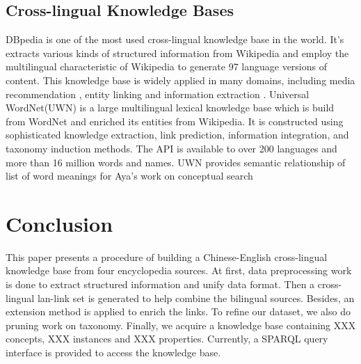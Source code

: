 \documentclass[runningheads,a4paper]{llncs}
\begin{document}
\subsection{Cross-lingual Knowledge Bases}
DBpedia \cite{auer2007dbpedia,mendes2012dbpedia} is one of the most used cross-lingual knowledge base in the world. It's extracts various kinds of structured information from Wikipedia and employ the multilingual characteristic of Wikipedia to generate 97 language versions of content. This knowledge base is widely applied in many domains, including media recommendation \cite{passant2010dbrec,fernandez2011generic,kaminskas2012knowledge}, entity linking\cite{mendes2011evaluating} and information extraction \cite{dutta2013integrating}.
Universal WordNet(UWN)\cite{de2012uwn} is a large multilingual lexical knowledge base which is build from WordNet and enriched its entities from Wikipedia. It is constructed using sophisticated knowledge extraction, link prediction, information integration, and taxonomy induction methods. The API is available to over 200 languages and more than 16 million words and names. UWN provides semantic relationship of list of word meanings for Aya's work on conceptual search \cite{al2015conceptual}


\section{Conclusion}
\label{sec:con}
This paper presents a procedure of building a Chinese-English cross-lingual knowledge base from four encyclopedia sources. At first, data preprocessing work is done to extract structured information and unify data format. Then a cross-lingual lan-link set is generated to help combine the bilingual sources. Besides, an extension method is applied to enrich the links. To refine our dataset, we also do pruning work on taxonomy. Finally, we acquire a knowledge base containing XXX concepts, XXX instances and XXX properties. Currently, a SPARQL query interface is provided to access the knowledge base. 
\end{document}
